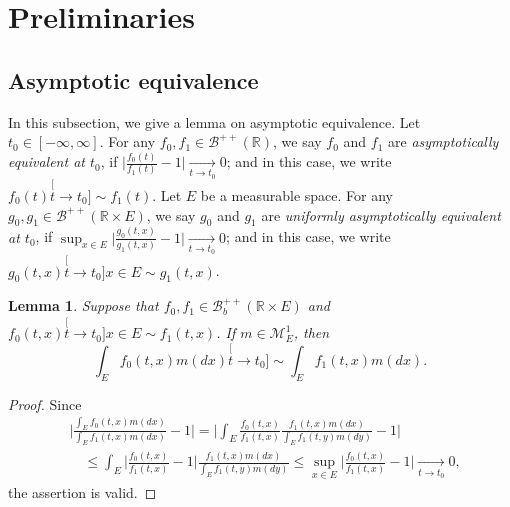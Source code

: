 \documentclass[12pt, a4paper]{amsart}
\newtheorem{lem}[thm]{Lemma}
\theoremstyle{definition}
\numberwithin{equation}{section}
\begin{document}
\section{Preliminaries} \label{sec: Preliminaries}
\subsection{Asymptotic equivalence} \label{sec: Asymptotic equivalence}
	In this subsection, we give a lemma on asymptotic equivalence.	
	Let $t_0 \in [-\infty,\infty]$.
	For any $f_0, f_1\in \mathscr B^{++}({\mathbb R})$, we say $f_0$ and $f_1$ are \emph{asymptotically equivalent at $t_0$}, if $\big|\frac{f_0(t)}{f_1(t)} - 1\big| \xrightarrow[t\to t_0]{} 0$;
	and in this case, we write $f_0(t) \stackrel[t\to t_0]{}{\sim} f_1(t)$.
	Let $E$ be a measurable space.
	For any $g_0, g_1\in \mathscr B^{++}({\mathbb R\times E})$, we say $g_0$ and $g_1$ are \emph{uniformly asymptotically equivalent at $t_0$}, if $\sup_{x\in E}\big|\frac{g_0(t,x)}{g_1(t,x)} - 1\big| \xrightarrow[t\to t_0]{} 0$; and in this case, we write $g_0(t,x)\stackrel[t\to t_0]{x\in E}{\sim}g_1(t,x)$.

\begin{lem} \label{lem: asymptotic equivalent of integration}
	Suppose that $f_0,f_1\in \mathscr B^{++}_b({\mathbb R \times E})$ and $f_0(t,x)\stackrel[t\to t_0]{x\in E}{\sim}f_1(t,x)$.
	If $m \in \mathcal M^1_E$, then
\begin{equation}
	\int_E f_0(t,x)m(dx)
	\stackrel[t\to t_0]{}{\sim}
	\int_E f_1(t,x)m(dx).
\end{equation}
\end{lem}
\begin{proof}
	Since
\begin{equation}\begin{split}
	&\Big| \frac{	\int_E f_0(t,x)m(dx) }{ 	\int_E f_1(t,x)m(dx)  } - 1 \Big|
	= \Big| \int_E \frac{f_0(t,x)}{f_1(t,x)} \frac{f_1(t,x)m(dx)}{	\int_E f_1(t,y)m(dy)  } - 1\Big|
	\\&\quad \leq \int_E \Big|  \frac{f_0(t,x)}{f_1(t,x)} - 1 \Big| \frac{f_1(t,x)m(dx)}{	\int_E f_1(t,y)m(dy)  }
	\leq \sup_{x\in E} \Big|  \frac{f_0(t,x)}{f_1(t,x)} - 1 \Big|
	\xrightarrow[t\to t_0]{} 0,
\end{split}\end{equation}
	the assertion is valid.
\end{proof}
\end{document}
